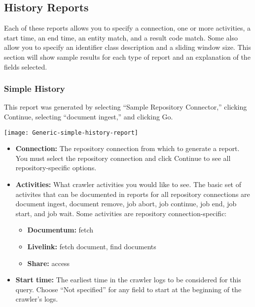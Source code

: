 \begin{changemargin}{1.5in}{0in}
\subsection{History Reports}

Each of these reports allows you to specify a connection, one or more
activities, a start time, an end time, an entity match, and a result code
match.  Some also allow you to specify an identifier class description
and a sliding window size. This section will show sample results for
each type of report and an explanation of the fields selected.

\subsubsection{Simple History}

This report was generated by selecting ``Sample Repository Connector,'' 
clicking Continue, selecting ``document ingest,'' and clicking Go.

\texttt{[image: Generic-simple-history-report]}

\begin{itemize}

\item \textbf{Connection:} The repository connection from which to
generate a report. You must select the repository connection and click
Continue to see all repository-specific options.

\item \textbf{Activities:} What crawler activities you would like to
see.  The basic set of activites that can be documented in reports for
all repository connections are document ingest, document remove, job
abort, job continue, job end, job start, and job wait. Some activities
are repository connection-specific:

\begin{itemize}

\item \textbf{Documentum:} fetch

\item \textbf{Livelink:} fetch document, find documents

\item \textbf{Share:} access

\end{itemize}

\item \textbf{Start time:} The earliest time in the crawler logs to be
considered for this query.  Choose ``Not specified'' for any field to
start at the beginning of the crawler's logs.


\end{itemize}
\end{changemargin}
